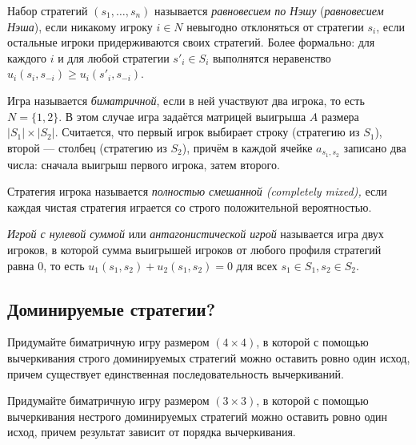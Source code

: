 Набор стратегий $(s_1,\ldots,s_n)$ называется {\it равновесием по Нэшу} ({\it равновесием Нэша}), если никакому игроку $i \in N$ невыгодно отклоняться от стратегии $s_i$, если остальные игроки придерживаются своих стратегий. Более формально: для каждого $i$ и для любой стратегии $s'_i \in S_i$ выполнятся неравенство $u_i(s_i,s_{-i}) \geq u_i(s'_i,s_{-i}).$

Игра называется \textit{биматричной}, если в ней участвуют два игрока, то есть $N = \{1,2\}$. В этом случае игра задаётся матрицей выигрыша $A$ размера $|S_1| \times |S_2|$. Считается, что первый игрок выбирает строку (стратегию из $S_1$), второй — столбец (стратегию из $S_2$), причём в каждой ячейке $a_{s_1,s_2}$ записано два числа: сначала выигрыш первого игрока, затем второго.

Стратегия игрока называется {\it полностью смешанной (completely mixed),} если каждая чистая стратегия играется со строго положительной вероятностью.

\textit{Игрой с нулевой суммой} или {\it антагонистической игрой} называется игра двух игроков, в которой сумма выигрышей игроков от любого профиля стратегий равна $0$, то есть $u_1(s_1,s_2)+u_2(s_1,s_2)=0$ для всех $s_1 \in S_1, s_2 \in S_2$.


\subsection{Доминируемые стратегии?}

\begin{problem}[Конструктор-4]
Придумайте биматричную игру размером  $\left(4\times 4\right)$, в которой с помощью вычеркивания строго доминируемых стратегий можно оставить ровно один исход, причем существует единственная последовательность вычеркиваний.
\begin{sol}
\end{sol}
\end{problem}

\begin{problem}[Конструктор-3]
Придумайте биматричную игру размером  $\left(3\times 3\right)$, в которой с помощью вычеркивания нестрого доминируемых стратегий можно оставить ровно один исход, причем результат зависит от порядка вычеркивания.\par
\begin{sol}
\end{sol}
\end{problem}

